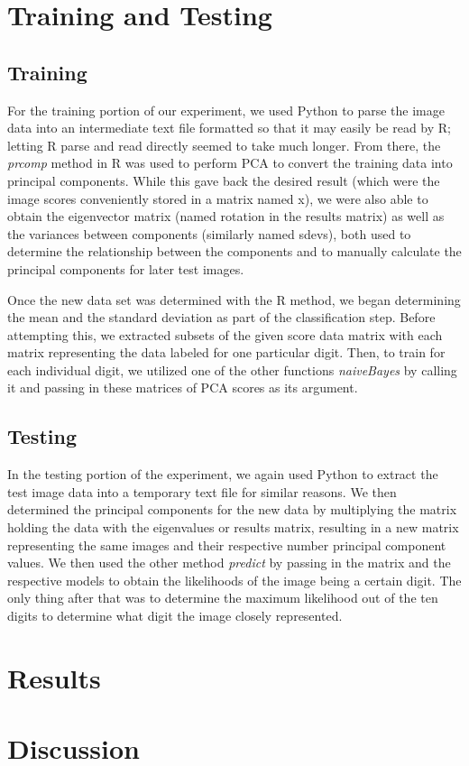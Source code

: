 \documentclass[twocolumn]{article}
\begin{document}
\section{Training and Testing} %
\subsection{Training} %
\label{subsec:training}
For the training portion of our experiment, we used Python to parse the image data into an intermediate text file formatted so that it may easily be read by R; letting R parse and read directly seemed to take much longer. From there, the \emph{prcomp} method in R was used to perform PCA to convert the training data into principal components. While this gave back the desired result (which were the image scores conveniently stored in a matrix named x), we were also able to obtain the eigenvector matrix (named rotation in the results matrix) as well as the variances between components (similarly named sdevs), both used to determine the relationship between the components and to manually calculate the principal components for later test images.

Once the new data set was determined with the R method, we began determining the mean and the standard deviation as part of the classification step. Before attempting this, we extracted subsets of the given score data matrix with each matrix representing the data labeled for one particular digit. Then, to train for each individual digit, we utilized one of the other functions \emph{naiveBayes} by calling it and passing in these matrices of PCA scores as its argument.

\subsection{Testing} %
\label{subsec:testing}
In the testing portion of the experiment, we again used Python to extract the test image data into a temporary text file for similar reasons. We then determined the principal components for the new data by multiplying the matrix holding the data with the eigenvalues or results matrix, resulting in a new matrix representing the same images and their respective number principal component values. We then used the other method \emph{predict} by passing in the matrix and the respective models to obtain the likelihoods of the image being a certain digit. The only thing after that was to determine the maximum likelihood out of the ten digits to determine what digit the image closely represented.
\section{Results} %
\label{sec:results}

\section{Discussion} %
\label{sec:discussion}
\cite{bayes}



\end{document}
